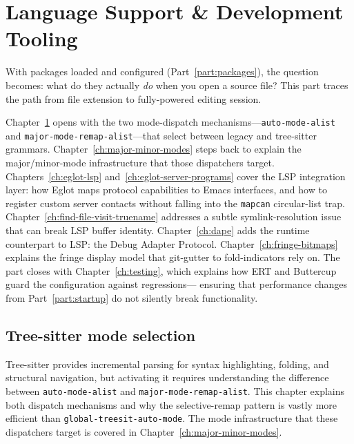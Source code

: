 \part{Language Support \& Development Tooling}
\label{part:lang}

With packages loaded and configured (Part~\ref{part:packages}), the
question becomes: what do they actually \emph{do} when you open a
source file?  This part traces the path from file extension to
fully-powered editing session.

Chapter~\ref{ch:tree-sitter} opens with the two mode-dispatch
mechanisms---\texttt{auto-mode-alist} and
\texttt{major-mode-remap-alist}---that select between legacy and
tree-sitter grammars.
Chapter~\ref{ch:major-minor-modes} steps back to explain the
major/minor-mode infrastructure that those dispatchers target.
Chapters~\ref{ch:eglot-lsp} and~\ref{ch:eglot-server-programs}
cover the LSP integration layer: how Eglot maps protocol capabilities
to Emacs interfaces, and how to register custom server contacts
without falling into the \texttt{mapcan} circular-list trap.
Chapter~\ref{ch:find-file-visit-truename} addresses a subtle
symlink-resolution issue that can break LSP buffer identity.
Chapter~\ref{ch:dape} adds the runtime counterpart to LSP: the
Debug Adapter Protocol.  Chapter~\ref{ch:fringe-bitmaps} explains
the fringe display model that git-gutter to fold-indicators rely on.
The part closes with Chapter~\ref{ch:testing}, which explains how
ERT and Buttercup guard the configuration against regressions---
ensuring that performance changes from Part~\ref{part:startup} do
not silently break functionality.

\chapter{Tree-sitter mode selection}
\label{ch:tree-sitter}
\minitoc\label{tree-sitter-mode-selection}

Tree-sitter provides incremental parsing for syntax highlighting,
folding, and structural navigation, but activating it requires
understanding the difference between \texttt{auto-mode-alist} and
\texttt{major-mode-remap-alist}.  This chapter explains both dispatch
mechanisms and why the selective-remap pattern is vastly more
efficient than \texttt{global-treesit-auto-mode}.  The mode
infrastructure that these dispatchers target is covered in
Chapter~\ref{ch:major-minor-modes}.

